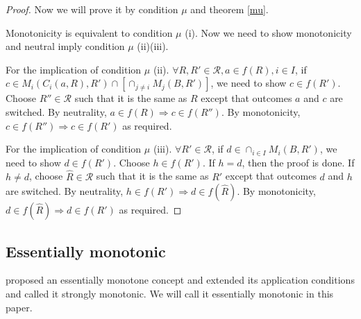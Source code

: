\begin{proof}

Now we will prove it by condition $\mu$ and theorem \ref{mu}.

Monotonicity is equivalent to condition $\mu$ (i). Now we need to show
monotonicity and neutral imply
condition $\mu$ (ii)(iii).

For the implication of condition $\mu$ (ii). $\forall R, R' \in
\mathscr{R}, a \in f(R), i \in I$, if $c \in M_i(C_i(a, R), R') \cap [ \cap_{j
  \not = i} M_j(B, R')]$, we need to show $c \in f(R')$. Choose $R''
\in \mathscr{R}$ such that it is the same as $R$ except that outcomes
$a$ and $c$ are switched. By neutrality, $a \in f(R) \Rightarrow c \in
f(R'')$. By monotonicity, $c \in f(R'')  \Rightarrow c \in f(R')$ as
required.

For the implication of condition $\mu$ (iii). $\forall R' \in
\mathscr{R}$, if $ d \in \cap_{i \in I}M_i(B, R')$, we need to show $d
\in f(R')$. Choose $h \in f(R')$. If $h = d$, then the proof is done. 
If $h \not = d$, choose $\hat{R}
\in \mathscr{R}$ such that it is the same as $R'$ except that outcomes
$d$ and $h$ are switched. By neutrality, $h \in f(R') \Rightarrow d
\in f(\hat{R})$. By monotonicity, $d \in f(\hat{R}) \Rightarrow d \in
f(R')$ as required.
\end{proof}



\subsection{Essentially monotonic}
\parencite{Danilov1992}  proposed an essentially monotone concept
and \parencite{Yamato1992} extended its application conditions and
called it strongly monotonic. We will call it essentially  monotonic in this
paper. 

